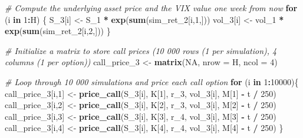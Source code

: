 \documentclass[]{article}
\newenvironment{Shaded}{\begin{snugshade}}{\end{snugshade}}
\newcommand{\CommentTok}[1]{\textcolor[rgb]{0.56,0.35,0.01}{\textit{#1}}}
\newcommand{\ControlFlowTok}[1]{\textcolor[rgb]{0.13,0.29,0.53}{\textbf{#1}}}
\newcommand{\DataTypeTok}[1]{\textcolor[rgb]{0.13,0.29,0.53}{#1}}
\newcommand{\DecValTok}[1]{\textcolor[rgb]{0.00,0.00,0.81}{#1}}
\newcommand{\KeywordTok}[1]{\textcolor[rgb]{0.13,0.29,0.53}{\textbf{#1}}}
\newcommand{\NormalTok}[1]{#1}
\newcommand{\OperatorTok}[1]{\textcolor[rgb]{0.81,0.36,0.00}{\textbf{#1}}}
\newcommand{\OtherTok}[1]{\textcolor[rgb]{0.56,0.35,0.01}{#1}}
\newcommand{\StringTok}[1]{\textcolor[rgb]{0.31,0.60,0.02}{#1}}
\begin{document}
\begin{Shaded}
\begin{Highlighting}[]
\CommentTok{# Compute the underlying asset price and the VIX value one week from now}
\ControlFlowTok{for}\NormalTok{ (i }\ControlFlowTok{in} \DecValTok{1}\OperatorTok{:}\NormalTok{H) \{}
\NormalTok{  S_}\DecValTok{3}\NormalTok{[i]   <-}\StringTok{ }\NormalTok{S_}\DecValTok{1} \OperatorTok{*}\StringTok{ }\KeywordTok{exp}\NormalTok{(}\KeywordTok{sum}\NormalTok{(sim_ret_}\DecValTok{2}\NormalTok{[i,}\DecValTok{1}\NormalTok{,]))}
\NormalTok{  vol_}\DecValTok{3}\NormalTok{[i] <-}\StringTok{ }\NormalTok{vol_}\DecValTok{1} \OperatorTok{*}\StringTok{ }\KeywordTok{exp}\NormalTok{(}\KeywordTok{sum}\NormalTok{(sim_ret_}\DecValTok{2}\NormalTok{[i,}\DecValTok{2}\NormalTok{,]))}
\NormalTok{\}}

\CommentTok{# Initialize a matrix to store call prices (10 000 rows (1 per simulation), 4 columns (1 per option))}
\NormalTok{call_price_}\DecValTok{3}\NormalTok{ <-}\StringTok{ }\KeywordTok{matrix}\NormalTok{(}\OtherTok{NA}\NormalTok{, }\DataTypeTok{nrow =}\NormalTok{ H, }\DataTypeTok{ncol =} \DecValTok{4}\NormalTok{)}

\CommentTok{# Loop through 10 000 simulations and price each call option}
\ControlFlowTok{for}\NormalTok{ (i }\ControlFlowTok{in} \DecValTok{1}\OperatorTok{:}\DecValTok{10000}\NormalTok{)\{}
\NormalTok{  call_price_}\DecValTok{3}\NormalTok{[i,}\DecValTok{1}\NormalTok{] <-}\StringTok{ }\KeywordTok{price_call}\NormalTok{(S_}\DecValTok{3}\NormalTok{[i], K[}\DecValTok{1}\NormalTok{], r_}\DecValTok{3}\NormalTok{, vol_}\DecValTok{3}\NormalTok{[i], M[}\DecValTok{1}\NormalTok{] }\OperatorTok{-}\StringTok{ }\NormalTok{t }\OperatorTok{/}\StringTok{ }\DecValTok{250}\NormalTok{)}
\NormalTok{  call_price_}\DecValTok{3}\NormalTok{[i,}\DecValTok{2}\NormalTok{] <-}\StringTok{ }\KeywordTok{price_call}\NormalTok{(S_}\DecValTok{3}\NormalTok{[i], K[}\DecValTok{2}\NormalTok{], r_}\DecValTok{3}\NormalTok{, vol_}\DecValTok{3}\NormalTok{[i], M[}\DecValTok{2}\NormalTok{] }\OperatorTok{-}\StringTok{ }\NormalTok{t }\OperatorTok{/}\StringTok{ }\DecValTok{250}\NormalTok{)}
\NormalTok{  call_price_}\DecValTok{3}\NormalTok{[i,}\DecValTok{3}\NormalTok{] <-}\StringTok{ }\KeywordTok{price_call}\NormalTok{(S_}\DecValTok{3}\NormalTok{[i], K[}\DecValTok{3}\NormalTok{], r_}\DecValTok{4}\NormalTok{, vol_}\DecValTok{3}\NormalTok{[i], M[}\DecValTok{3}\NormalTok{] }\OperatorTok{-}\StringTok{ }\NormalTok{t }\OperatorTok{/}\StringTok{ }\DecValTok{250}\NormalTok{)}
\NormalTok{  call_price_}\DecValTok{3}\NormalTok{[i,}\DecValTok{4}\NormalTok{] <-}\StringTok{ }\KeywordTok{price_call}\NormalTok{(S_}\DecValTok{3}\NormalTok{[i], K[}\DecValTok{4}\NormalTok{], r_}\DecValTok{4}\NormalTok{, vol_}\DecValTok{3}\NormalTok{[i], M[}\DecValTok{4}\NormalTok{] }\OperatorTok{-}\StringTok{ }\NormalTok{t }\OperatorTok{/}\StringTok{ }\DecValTok{250}\NormalTok{)}
\NormalTok{\}}


\end{Highlighting}
\end{Shaded}
\end{document}
